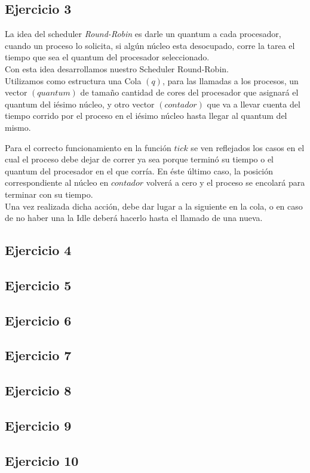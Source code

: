 \subsection{Ejercicio 3}
La idea del scheduler \textit{Round-Robin} es darle un quantum a cada procesador, cuando un proceso lo solicita, si alg\'un n\'ucleo esta desocupado, corre la tarea el tiempo que sea el quantum del procesador seleccionado.\\
Con esta idea desarrollamos nuestro Scheduler Round-Robin.\\
Utilizamos como estructura una Cola $(q)$, para las llamadas a los procesos, 
un vector $(quantum)$ de tama\~no cantidad de cores del procesador que asignar\'a el quantum del i\'esimo n\'ucleo, 
y otro vector $(contador)$ que va a llevar cuenta del tiempo corrido por el proceso en el i\'esimo n\'ucleo hasta llegar al quantum del mismo.

Para el correcto funcionamiento en la funci\'on $tick$ se ven reflejados los casos en el cual el proceso debe dejar de correr ya sea porque termin\'o su tiempo o el quantum del procesador en el que corr\'ia. En \'este \'ultimo caso, la posici\'on correspondiente al n\'ucleo en $contador$ volver\'a a cero y el proceso se encolar\'a para terminar con su tiempo. 
\\Una vez realizada dicha acci\'on, debe dar lugar a la siguiente en la cola, o en caso de no haber una la Idle deber\'a hacerlo hasta el llamado de una nueva.
\subsection{Ejercicio 4}
\subsection{Ejercicio 5}
\subsection{Ejercicio 6}
\subsection{Ejercicio 7}
\subsection{Ejercicio 8}
\subsection{Ejercicio 9}
\subsection{Ejercicio 10}